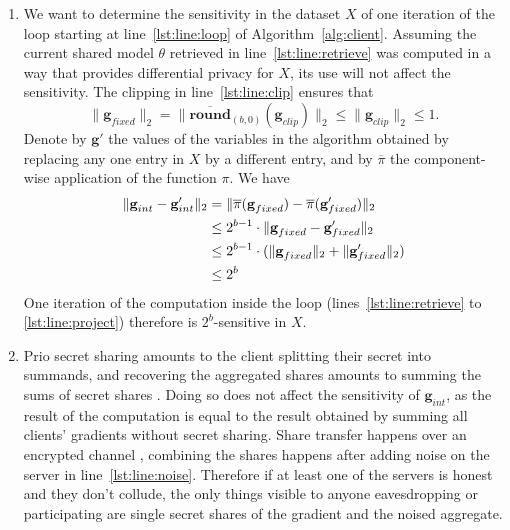 \documentclass{article}
\begin{document}
\begin{enumerate}
\item We want to determine the sensitivity in the dataset $X$ of one iteration of the loop starting at line~\ref{lst:line:loop} of Algorithm~\ref{alg:client}. Assuming the current shared model $\theta$ retrieved in line~\ref{lst:line:retrieve} was computed in a way that provides differential privacy for $X$, its use will not affect the sensitivity. The clipping in line~\ref{lst:line:clip} ensures that 
\[\|\textbf{g}_{fixed}\|_2 = \|\overline{\textbf{round}}_{(b,0)}(\textbf{g}_{clip})\|_2\leq\|\textbf{g}_{clip}\|_2\leq 1.\]
Denote by $\textbf{g}'$ the values of the variables in the algorithm obtained by replacing any one entry in $X$ by a different entry, and by $\overline\pi$ the component-wise application of the function $\pi$. We have
\begin{align*}
\|\textbf g_{int} - \textbf g_{int}'\|_2 &= \|\overline\pi(\textbf g_{fixed}) - \overline \pi(\textbf g_{fixed}')\|_2 \\
&\leq 2^{b-1} \cdot \| \textbf g_{fixed}- \textbf g_{fixed}'\|_2\\
&\leq 2^{b-1} \cdot (\| \textbf g_{fixed}\|_2 + \|\textbf g_{fixed}'\|_2)\\
&\leq 2^b
\end{align*}
One iteration of the computation inside the loop (lines~\ref{lst:line:retrieve} to \ref{lst:line:project}) therefore is $2^b$-sensitive in $X$.

\item Prio secret sharing amounts to the client splitting their secret into summands, and recovering the aggregated shares amounts to summing the sums of secret shares \cite[Scheme on page 3]{prio}. Doing so does not affect the sensitivity of $\textbf{g}_{int}$, as the result of the computation is equal to the result obtained by summing all clients' gradients without secret sharing. Share transfer happens over an encrypted channel \cite[Step 1 of Scheme on page 3]{prio}, combining the shares happens after adding noise on the server in line~\ref{lst:line:noise}. Therefore if at least one of the servers is honest and they don't collude, the only things visible to anyone eavesdropping or participating are single secret shares of the gradient and the noised aggregate.


\end{enumerate}
\end{document}
